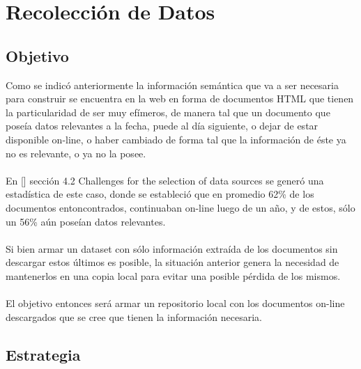 \chapter{Recolección de Datos}
\label{chapter:recoleccion}

\section{Objetivo}
\label{section:recoleccion-objetivo}

\noindent Como se indicó anteriormente la información semántica que va a ser necesaria para construir se encuentra en la web en forma de documentos 
HTML que tienen la particularidad de ser muy efímeros, de manera tal que un documento que poseía datos relevantes a la fecha,
puede al día siguiente, o dejar de estar disponible on-line, o haber cambiado de forma tal que la información de éste ya no es 
relevante, o ya no la posee. 
\\\\
En [] sección 4.2 Challenges for the selection of data sources se generó una estadística de este caso, donde se estableció que 
en promedio 62\% de los documentos entoncontrados, continuaban on-line luego de un año, y de estos, sólo un 56\% aún poseían 
datos relevantes. 
\\\\
Si bien armar un dataset con sólo información extraída de los documentos sin descargar estos últimos es posible, la situación anterior 
genera la necesidad de mantenerlos en una copia local para evitar una posible pérdida de los mismos. 
\\\\
El objetivo entonces será armar un repositorio local con los documentos on-line descargados que se cree que tienen la información 
necesaria. 

 
\section{Estrategia}
\label{section:recoleccion-estrategia}

